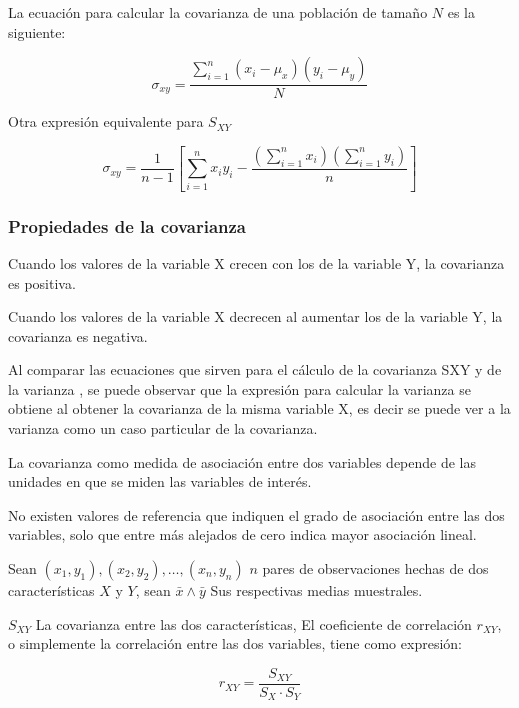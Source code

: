 La ecuación para calcular la covarianza de una población de tamaño $N$ es la siguiente:

\begin{equation}
    \sigma_{xy}=\frac{\sum_{i=1}^{n} \left(x_i-\mu_{x}\right)\left(y_i-\mu_{y}\right)}{N}
\end{equation}

Otra expresión equivalente para $S_{XY}$

\begin{equation}
    \sigma_{xy}=\frac{1}{n-1}\left[ \sum_{i=1}^{n}x_iy_i-\frac{\left(\sum_{i=1}^{n}x_i\right)\left(\sum_{i=1}^{n}y_i\right)}{n} \right]
\end{equation}

\subsubsection{Propiedades de la covarianza}

Cuando los valores de la variable X crecen con
los de la variable Y, la covarianza es positiva.

Cuando los valores de la variable X decrecen al
aumentar los de la variable Y, la covarianza es
negativa.

Al comparar las ecuaciones que sirven para el
cálculo de la covarianza SXY y de la varianza ,
se puede observar que la expresión para calcular la
varianza se obtiene al obtener la covarianza de la
misma variable X, es decir se puede ver a la
varianza como un caso particular de la covarianza.

La covarianza como medida de asociación entre dos
variables depende de las unidades en que se miden
las variables de interés.

No existen valores de referencia que indiquen el
grado de asociación entre las dos variables, solo que
entre más alejados de cero indica mayor asociación
lineal.

\begin{definition}
    Sean $(x_1,y_1), (x_2,y_2),\dots,(x_n,y_n)$ $n$ pares de observaciones
    hechas de dos características $X$ y $Y$, sean $\bar{x}\land \bar{y}$ Sus respectivas medias muestrales.

    $S_{XY}$ La covarianza entre las dos características, El coeficiente de correlación $r_{XY}$, o simplemente la correlación
    entre las dos variables, tiene como expresión:

    \begin{equation}
        r_{XY}=\frac{S_{XY}}{S_{X}\cdot S_{Y}}
    \end{equation}
\end{definition}

